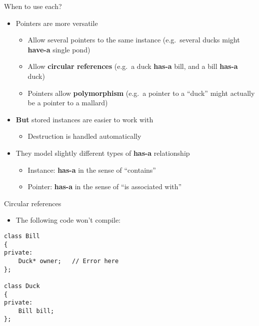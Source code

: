 \begin{frame}{When to use each?}
    \begin{itemize}
        \item Pointers are more versatile \pause
            \begin{itemize}
                \item Allow several pointers to the same instance (e.g.\ several ducks might \textbf{have-a} single pond) \pause
                \item Allow \textbf{circular references} (e.g.\ a duck \textbf{has-a} bill, and a bill \textbf{has-a} duck) \pause
                \item Pointers allow \textbf{polymorphism} (e.g.\ a pointer to a ``duck'' might actually be a pointer to a mallard) \pause
            \end{itemize}
        \item \textbf{But} stored instances are easier to work with \pause
            \begin{itemize}
                \item Destruction is handled automatically \pause
            \end{itemize}
        \item They model slightly different types of \textbf{has-a} relationship \pause
            \begin{itemize}
                \item Instance: \textbf{has-a} in the sense of ``contains'' \pause
                \item Pointer: \textbf{has-a} in the sense of ``is associated with''
            \end{itemize}
    \end{itemize}
\end{frame}

\begin{frame}[fragile]{Circular references}
    \begin{itemize}
        \item The following code won't compile:
    \end{itemize}
    \begin{lstlisting}
class Bill
{
private:
    Duck* owner;   // Error here
};

class Duck
{
private:
    Bill bill;
};
    \end{lstlisting}
\end{frame}

